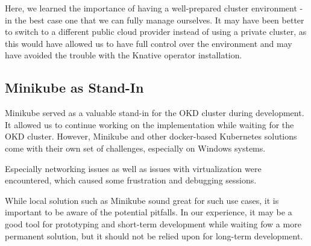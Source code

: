 \documentclass[12pt,a4paper,onecolumn,twoside]{tau-class/tau}
\begin{document}
Here, we learned the importance of having a well-prepared cluster environment - in the best case one that we can fully manage ourselves. It may have been better to switch to a different public cloud provider instead of using a private cluster, as this would have allowed us to have full control over the environment and may have avoided the trouble with the Knative operator installation.

\subsection{Minikube as Stand-In}

Minikube served as a valuable stand-in for the OKD cluster during development. It allowed us to continue working on the implementation while waiting for the OKD cluster. However, Minikube and other docker-based Kubernetes solutions come with their own set of challenges, especially on Windows systems.

Especially networking issues as well as issues with virtualization were encountered, which caused some frustration and debugging sessions.

While local solution such as Minikube sound great for such use cases, it is important to be aware of the potential pitfalls. In our experience, it may be a good tool for prototyping and short-term development while waiting fow a more permanent solution, but it should not be relied upon for long-term development.
\end{document}
